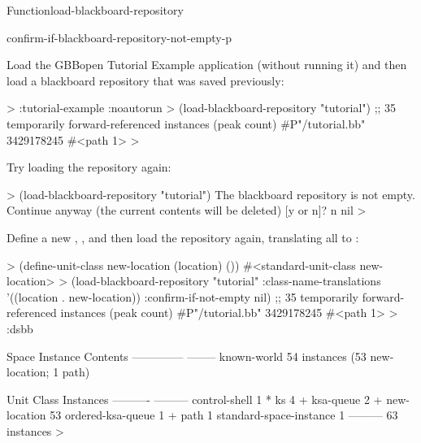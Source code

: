 \documentclass[10pt,twoside,english,pdftex]{article}
\begin{document}
\begin{functiondoc}{Function}{load-blackboard-repository}
\begin{alsos}{confirm-if-blackboard-repository-not-empty-p}
\end{alsos}

\fnexamples Load the GBBopen Tutorial Example application (without running it)
and then load a blackboard repository that was saved previously:
%
\W\supp
\begin{example}
  > :tutorial-example :noautorun 
  > (load-blackboard-repository "tutorial")
  ;; 35 temporarily forward-referenced instances (peak count)
  #P"/tutorial.bb"
  3429178245
  #<path 1>
  >
\end{example}
%
Try loading the repository again:
%
\W\supp\notpretop
\begin{example}
  > (load-blackboard-repository "tutorial")
  The blackboard repository is not empty.
  Continue anyway (the current contents will be deleted) [y or n]? n
  nil
  >
\end{example}
%
Define a new , , and then load the
repository again, translating all 
 to  :
%
\W\supp\notpretop
\begin{example}
  > (define-unit-class new-location (location) ())
  #<standard-unit-class new-location>
  > (load-blackboard-repository "tutorial"
      :class-name-translations '((location . new-location))
      :confirm-if-not-empty nil)
  ;; 35 temporarily forward-referenced instances (peak count)
  #P"/tutorial.bb"
  3429178245
  #<path 1>
  > :dsbb

  Space Instance                Contents
  --------------                --------
  known-world                   54 instances (53 new-location; 1 path)

  Unit Class                    Instances
  ----------                    ---------
  control-shell                         1 *
  ks                                    4 +
  ksa-queue                             2 +
  new-location                         53  
  ordered-ksa-queue                     1 +
  path                                  1  
  standard-space-instance               1  
                                ---------
                                       63 instances
  >
\end{example}

\end{functiondoc}
\end{document}
